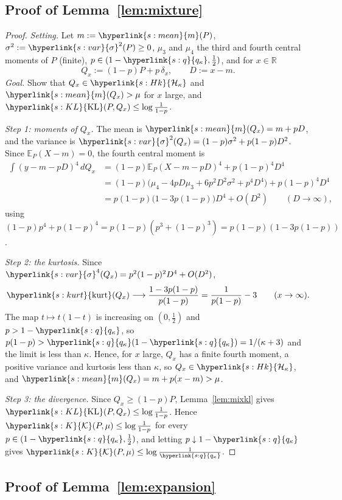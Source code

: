 \documentclass[11pt]{article}
\newcommand{\E}{\mathbb{E}}
\newcommand{\R}{\mathbb{R}}
\newcommand{\sy}[2]{{\hyperlink{#1}{#2}}}
\newcommand{\mean}{\sy{s:mean}{m}}
\newcommand{\sd}{\sy{s:var}{\sigma}}
\newcommand{\kurt}{\sy{s:kurt}{\mathrm{kurt}}}
\newcommand{\KL}{\sy{s:KL}{\mathrm{KL}}}
\newcommand{\Hk}{\sy{s:Hk}{\mathcal{H}_{\kappa}}}
\newcommand{\Kc}{\sy{s:K}{\mathcal{K}}}
\newcommand{\qk}{\sy{s:q}{q_{\kappa}}}
\begin{document}
\subsection{Proof of Lemma~\ref{lem:mixture}}\label{sec:proof-lem-mixture}

\begin{proof}
\emph{Setting.} Let $m:=\mean(P)$, $\sigma^2:=\sd^2(P)\ge0$, $\mu_3$ and $\mu_4$ the third and fourth central moments of $P$
(finite), $p\in(1-\qk,\frac12)$, and for $x\in\R$
\begin{equation*}
  Q_x:=(1-p)P+p\,\delta_x,\qquad D:=x-m .
\end{equation*}
\emph{Goal.} Show that $Q_x\in\Hk$ and $\mean(Q_x)>\mu$ for $x$ large, and $\KL(P,Q_x)\le\log\frac1{1-p}$.

\emph{Step 1: moments of $Q_x$.} The mean is $\mean(Q_x)=m+pD$, and the variance is
$\sd^2(Q_x)=(1-p)\sigma^2+p(1-p)D^2$. Since $\E_P(X-m)=0$, the fourth central moment is
\begin{align*}
  \int(y-m-pD)^4\,dQ_x&=(1-p)\E_P(X-m-pD)^4+p(1-p)^4D^4\\
  &=(1-p)\bigl(\mu_4-4pD\mu_3+6p^2D^2\sigma^2+p^4D^4\bigr)+p(1-p)^4D^4\\
  &=p(1-p)\bigl(1-3p(1-p)\bigr)D^4+O(D^2)\qquad(D\to\infty),
\end{align*}
using $(1-p)p^4+p(1-p)^4=p(1-p)(p^3+(1-p)^3)=p(1-p)(1-3p(1-p))$.

\emph{Step 2: the kurtosis.} Since $\sd^4(Q_x)=p^2(1-p)^2D^4+O(D^2)$,
\begin{equation*}
  \kurt(Q_x)\longrightarrow\frac{1-3p(1-p)}{p(1-p)}=\frac1{p(1-p)}-3\qquad(x\to\infty).
\end{equation*}
The map $t\mapsto t(1-t)$ is increasing on $(0,\frac12)$ and $p>1-\qk$, so $p(1-p)>\qk(1-\qk)=1/(\kappa+3)$ and the limit
is less than $\kappa$. Hence, for $x$ large, $Q_x$ has a finite fourth moment, a positive variance and kurtosis
less than $\kappa$, so $Q_x\in\Hk$, and $\mean(Q_x)=m+p(x-m)>\mu$.

\emph{Step 3: the divergence.} Since $Q_x\ge(1-p)P$, Lemma~\ref{lem:mixkl} gives $\KL(P,Q_x)\le\log\frac1{1-p}$. Hence
$\Kc(P,\mu)\le\log\frac1{1-p}$ for every $p\in(1-\qk,\frac12)$, and letting $p\downarrow1-\qk$ gives $\Kc(P,\mu)\le\log\frac1{\qk}$.
\end{proof}

\subsection{Proof of Lemma~\ref{lem:expansion}}\label{sec:proof-lem-expansion}
\end{document}
